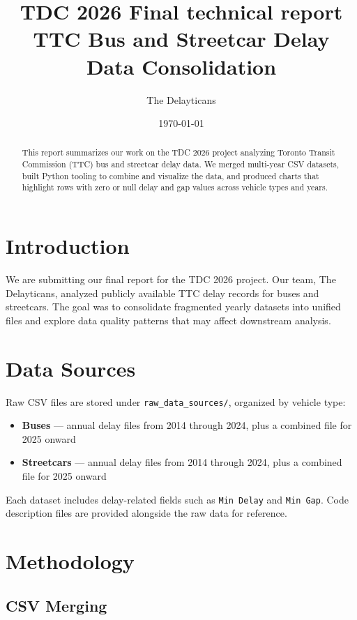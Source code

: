 \documentclass[11pt]{article}
\title{TDC 2026 Final technical report\\[0.5em]
\large TTC Bus and Streetcar Delay Data Consolidation}
\author{The Delayticans}
\date{\today}
\begin{document}
\maketitle

\begin{abstract}
This report summarizes our work on the TDC 2026 project analyzing Toronto Transit Commission (TTC)
bus and streetcar delay data. We merged multi-year CSV datasets, built Python tooling to combine and
visualize the data, and produced charts that highlight rows with zero or null delay and gap values
across vehicle types and years.
\end{abstract}

\section{Introduction}

We are submitting our final report for the TDC 2026 project. Our team, The Delayticans, analyzed
publicly available TTC delay records for buses and streetcars. The goal was to consolidate fragmented
yearly datasets into unified files and explore data quality patterns that may affect downstream
analysis.

\section{Data Sources}

Raw CSV files are stored under \texttt{raw\_data\_sources/}, organized by vehicle type:

\begin{itemize}[noitemsep]
    \item \textbf{Buses} --- annual delay files from 2014 through 2024, plus a combined file for 2025 onward
    \item \textbf{Streetcars} --- annual delay files from 2014 through 2024, plus a combined file for 2025 onward
\end{itemize}

Each dataset includes delay-related fields such as \texttt{Min Delay} and \texttt{Min Gap}. Code
description files are provided alongside the raw data for reference.

\section{Methodology}

\subsection{CSV Merging}
\end{document}
